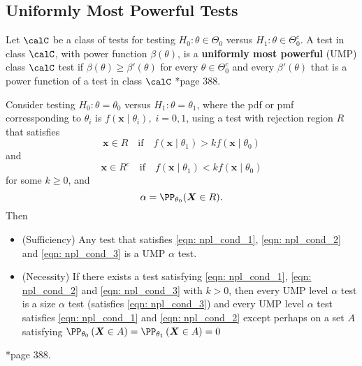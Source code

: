 \subsection*{Uniformly Most Powerful Tests}

\begin{defe} \label{defe: UMP_tests}
    Let $\calC$ be a class of tests for testing $H_0 : \theta \in \Theta_0$ versus $H_1 : \theta \in \Theta_0^c$. A test in class $\calC$, with power function $\beta (\theta)$, is a {\bf uniformly most powerful} (UMP) class $\calC$ test if $\beta (\theta) \geq \beta' (\theta)$ for every $\theta \in \Theta_0^c$ and every $\beta' (\theta)$ that is a power function of a test in class $\calC$ \cite{CasellaGeorge2001SI}*{page 388}.
\end{defe}

\begin{thm} \label{thm: npl}
    Consider testing $H_0 : \theta = \theta_0$ versus $H_1 : \theta = \theta_1$, where the pdf or pmf corressponding to $\theta_i$ is $f(\bm{x} \mid \theta_i), \; i=0,1$, using a test with rejection region $R$ that satisfies
    \begin{equation} \label{eqn: npl_cond_1}
        \bm{x} \in R \quad \text{if} \quad f(\bm{x} \mid \theta_1) > k f(\bm{x} \mid \theta_0)
    \end{equation}
    and
    \begin{equation} \label{eqn: npl_cond_2}
        \bm{x} \in R^c \quad \text{if} \quad f(\bm{x} \mid \theta_1) < k f(\bm{x} \mid \theta_0)
    \end{equation}
    for some $k \geq 0$, and
    \begin{equation} \label{eqn: npl_cond_3}
        \alpha = \PP_{\theta_0} (\bm{X} \in R).
    \end{equation}
    Then
    \begin{itemize}
        \item (Sufficiency) Any test that satisfies \ref{eqn: npl_cond_1}, \ref{eqn: npl_cond_2} and \ref{eqn: npl_cond_3} is a UMP $\alpha$ test.
        \item (Necessity) If there exists a test satisfying \ref{eqn: npl_cond_1}, \ref{eqn: npl_cond_2} and \ref{eqn: npl_cond_3} with $k > 0$, then every UMP level $\alpha$ test is a size $\alpha$ test (satisfies \ref{eqn: npl_cond_3}) and every UMP level $\alpha$ test satisfies \ref{eqn: npl_cond_1} and \ref{eqn: npl_cond_2} except perhaps on a set $A$ satisfying $\PP_{\theta_0} \left( \bm{X} \in A \right) = \PP_{\theta_1} \left( \bm{X} \in A \right) = 0$
    \end{itemize}
    \cite{CasellaGeorge2001SI}*{page 388}.
\end{thm}


